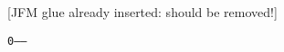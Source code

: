 \documentclass{article}
\begin{document}
\def\SHOWNODE{}%
\def\TT#1{\texttt{#1}\null}

[JFM glue already inserted: should be removed!]\par
\TT{0------}
\end{document}

